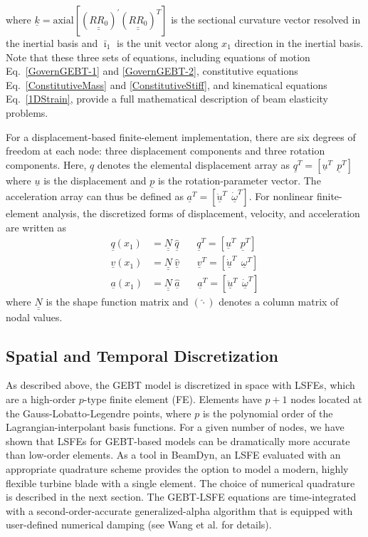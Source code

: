 \documentclass{aiaa-tc}
\newcommand{\tens}[1]{\underline{\underline{#1}}}
\renewcommand{\vec}[1]{\underline{#1}}
\begin{document}
where $\vec{k} = \mathrm{axial}[(\tens{R R_0})^\prime (\tens{R R_0})^T]$ is the sectional
curvature vector resolved in the inertial basis and $\bar{\imath}_1$ is the unit
vector along $x_1$ direction in the inertial basis. Note that these
three sets of equations, including equations of motion
Eq.~\eqref{GovernGEBT-1} and \eqref{GovernGEBT-2}, constitutive equations
Eq.~\eqref{ConstitutiveMass} and \eqref{ConstitutiveStiff}, and kinematical
equations Eq.~\eqref{1DStrain}, provide a full mathematical description of beam elasticity problems. 

For a displacement-based finite-element implementation, there are six
degrees of freedom at each node: three displacement components and three
rotation components. Here, $\vec{q}$ denotes the elemental
displacement array as $\underline{q}^T=\left[
\underline{u}^T~~\underline{p}^T\right]$ where $\vec{u}$ is the
displacement and $\vec{p}$ is the rotation-parameter vector. The
acceleration array can thus be defined as $\underline{a}^T=\left[
\ddot{\underline{u}}^T~~ \dot{\underline{\omega}}^T \right]$. For nonlinear
finite-element analysis, the discretized forms of
displacement, velocity, and acceleration are written as
\begin{align}
	\label{DiscretizedDisp}
	\underline{q} (x_1) &= \underline{\underline{N}} ~\hat{\underline{q}}~~~~~~~~\underline{q}^T = \left[ \underline{u}^T~~\underline{p}^T \right] \\
	\label{DiscretizedVel}
	\underline{v}(x_1) &= \underline{\underline{N}}~\hat{\underline{v}}~~~~~~~~\underline{v}^T = \left[\underline{\dot{u}}^T~~\underline{\omega}^T \right] \\
	\label{DiscretizedAcc}
	\underline{a}(x_1) &= \underline{\underline{N}}~ \hat{\underline{a}}~~~~~~~~\underline{a}^T = \left[ \ddot{\underline{u}}^T~~\dot{\underline{\omega}}^T \right]	
\end{align}
where $\tens{N}$ is the shape function matrix and $(\hat{\cdot})$ denotes a
column matrix of nodal values.

\subsection{Spatial and Temporal Discretization}

As described above, the GEBT model is discretized in space with LSFEs\cite{Ronquist-Patera:1987}, which are a high-order $p$-type finite element (FE).   
Elements have $p+1$ nodes located at the Gauss-Lobatto-Legendre points, where $p$ is the polynomial order of the Lagrangian-interpolant basis functions.  
For a given number of nodes, we have shown\cite{Wang:SFE2013,Wang:GEBT2014} that LSFEs for GEBT-based models can be dramatically more accurate than low-order elements.   
As a tool in BeamDyn, an LSFE evaluated with an appropriate quadrature scheme provides the option to model a modern, highly flexible turbine blade with a single element.  
The choice of numerical quadrature is described in the next section.
The GEBT-LSFE equations are time-integrated with a second-order-accurate generalized-alpha algorithm that is equipped with user-defined numerical damping (see Wang et al.\cite{Wang:GEBT2014} for details).  
\end{document}
